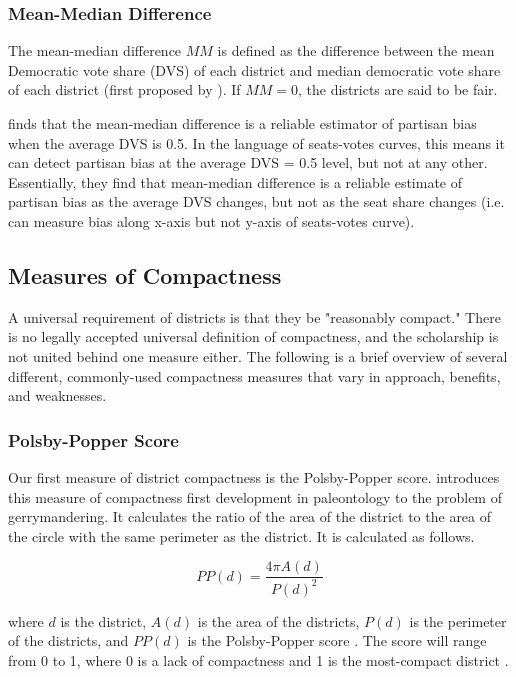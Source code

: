 \subsubsection{Mean-Median Difference}
\label{sec:meanmed}

The mean-median difference $MM$ is defined as the difference between the mean Democratic vote share (DVS) of each district and median democratic vote share of each district (first proposed by \textcite{mcdonald2015}). If $MM = 0$, the districts are said to be fair. 

\textcite{katz2020} finds that the mean-median difference is a reliable estimator of partisan bias when the average DVS is 0.5. In the language of seats-votes curves, this means it can detect partisan bias at the average DVS = 0.5 level, but not at any other. Essentially, they find that mean-median difference is a reliable estimate of partisan bias as the average DVS changes, but not as the seat share changes (i.e. can measure bias along x-axis but not y-axis of seats-votes curve). \parencite[27-9]{katz2020}

\subsection{Measures of Compactness}

A universal requirement of districts is that they be "reasonably compact." There is no legally accepted universal definition of compactness, and the scholarship is not united behind one measure either. The following is a brief overview of several different, commonly-used compactness measures that vary in approach, benefits, and weaknesses. 

\subsubsection{Polsby-Popper Score}
\label{sec:polsbypopper}

Our first measure of district compactness is the Polsby-Popper score. \textcite{polsby1991} introduces this measure of compactness first development in paleontology to the problem of gerrymandering. It calculates the ratio of the area of the district to the area of the circle with the same perimeter as the district. It is calculated as follows.

\begin{equation}
    PP(d) = \frac{4 \pi A(d)}{P(d)^2}
\end{equation}

where $d$ is the district, $A(d)$ is the area of the districts, $P(d)$ is the perimeter of the districts, and $PP(d)$ is the Polsby-Popper score \parencite{cox1927,polsby1991}. The score will range from 0 to 1, where 0 is a lack of compactness and 1 is the most-compact district \parencite{polsby1991}.

